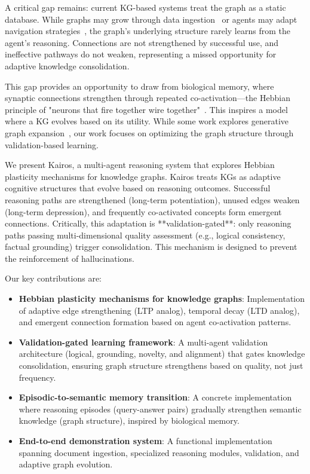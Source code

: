 \documentclass{article}
\begin{document}
A critical gap remains: current KG-based systems treat the graph as a static database. While graphs may grow through data ingestion~\citep{edge2024graphrag} or agents may adapt navigation strategies~\citep{chen2024pog}, the graph's underlying structure rarely learns from the agent's reasoning. Connections are not strengthened by successful use, and ineffective pathways do not weaken, representing a missed opportunity for adaptive knowledge consolidation.

This gap provides an opportunity to draw from biological memory, where synaptic connections strengthen through repeated co-activation—the Hebbian principle of "neurons that fire together wire together"~\citep{hebb1949organization,squire2015memory}. This inspires a model where a KG evolves based on its utility. While some work explores generative graph expansion~\citep{buehler2025agentic}, our work focuses on optimizing the graph structure through validation-based learning.

We present Kairos, a multi-agent reasoning system that explores Hebbian plasticity mechanisms for knowledge graphs. Kairos treats KGs as adaptive cognitive structures that evolve based on reasoning outcomes. Successful reasoning paths are strengthened (long-term potentiation), unused edges weaken (long-term depression), and frequently co-activated concepts form emergent connections. Critically, this adaptation is **validation-gated**: only reasoning paths passing multi-dimensional quality assessment (e.g., logical consistency, factual grounding) trigger consolidation. This mechanism is designed to prevent the reinforcement of hallucinations.

Our key contributions are:
\begin{itemize}
    \item \textbf{Hebbian plasticity mechanisms for knowledge graphs}: Implementation of adaptive edge strengthening (LTP analog), temporal decay (LTD analog), and emergent connection formation based on agent co-activation patterns.
    \item \textbf{Validation-gated learning framework}: A multi-agent validation architecture (logical, grounding, novelty, and alignment) that gates knowledge consolidation, ensuring graph structure strengthens based on quality, not just frequency.
    \item \textbf{Episodic-to-semantic memory transition}: A concrete implementation where reasoning episodes (query-answer pairs) gradually strengthen semantic knowledge (graph structure), inspired by biological memory.
    \item \textbf{End-to-end demonstration system}: A functional implementation spanning document ingestion, specialized reasoning modules, validation, and adaptive graph evolution.
\end{itemize}
\end{document}
